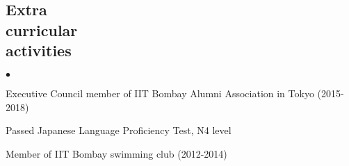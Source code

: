 \documentclass[margin,line]{res}
\newenvironment{list2}{
  \begin{list}{$\bullet$}{%
      \setlength{\itemsep}{0in}
      \setlength{\parsep}{0in} \setlength{\parskip}{0in}
      \setlength{\topsep}{0in} \setlength{\partopsep}{0in} 
      \setlength{\leftmargin}{0.2in}}}{\end{list}}
\begin{document}
\begin{resume}
\section{\sc Extra\\curricular\\activities} 
\begin{list2}
	\item Executive Council member of IIT Bombay Alumni Association in Tokyo (2015-2018)
	\item Passed Japanese Language Proficiency Test, N4 level
	\item Member of IIT Bombay swimming club (2012-2014)

\end{list2}

\end{resume}
\end{document}
